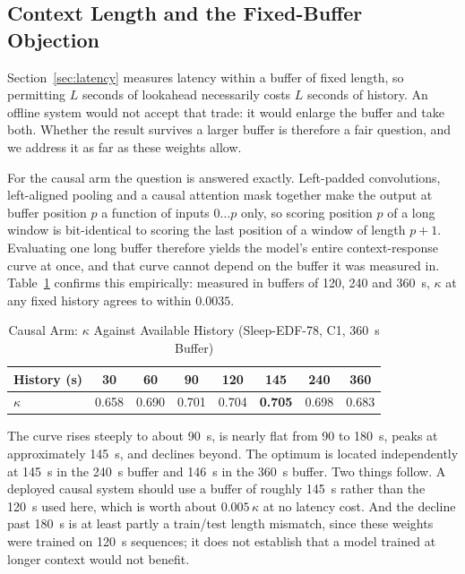 \documentclass[conference]{IEEEtran}
\begin{document}
\subsection{Context Length and the Fixed-Buffer Objection}
\label{sec:buffer}

Section~\ref{sec:latency} measures latency within a buffer of fixed length, so permitting $L$ seconds of
lookahead necessarily costs $L$ seconds of history. An offline system would not accept that trade: it would
enlarge the buffer and take both. Whether the result survives a larger buffer is therefore a fair question,
and we address it as far as these weights allow.

For the causal arm the question is answered exactly. Left-padded convolutions, left-aligned pooling and a
causal attention mask together make the output at buffer position $p$ a function of inputs $0 \ldots p$
only, so scoring position $p$ of a long window is bit-identical to scoring the last position of a window of
length $p+1$. Evaluating one long buffer therefore yields the model's entire context-response curve at
once, and that curve cannot depend on the buffer it was measured in. Table~\ref{tab:context} confirms this
empirically: measured in buffers of 120, 240 and 360~s, $\kappa$ at any fixed history agrees to within
$0.0035$.

\begin{table}[t]
\caption{Causal Arm: $\kappa$ Against Available History (Sleep-EDF-78, C1, 360~s Buffer)}
\label{tab:context}
\centering
\footnotesize
\setlength{\tabcolsep}{3.4pt}
\begin{tabular}{lccccccc}
\toprule
History (s) & 30 & 60 & 90 & 120 & \textbf{145} & 240 & 360 \\
\midrule
$\kappa$ & 0.658 & 0.690 & 0.701 & 0.704 & \textbf{0.705} & 0.698 & 0.683 \\
\bottomrule
\end{tabular}
\end{table}

The curve rises steeply to about 90~s, is nearly flat from 90 to 180~s, peaks at approximately 145~s, and
declines beyond. The optimum is located independently at 145~s in the 240~s buffer and 146~s in the 360~s
buffer. Two things follow. A deployed causal system should use a buffer of roughly 145~s rather than the
120~s used here, which is worth about $0.005\,\kappa$ at no latency cost. And the decline past 180~s is at
least partly a train/test length mismatch, since these weights were trained on 120~s sequences; it does not
establish that a model trained at longer context would not benefit.
\end{document}
